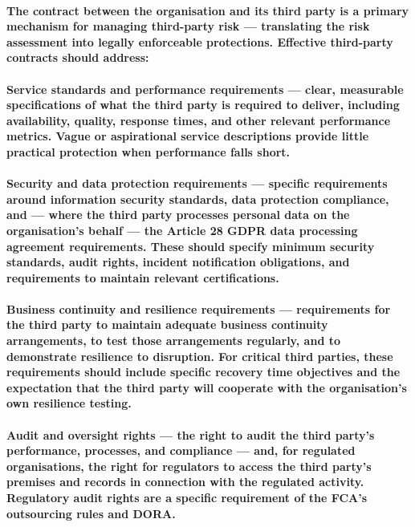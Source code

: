 \paragraph{The contract between the organisation and its third party is a primary mechanism for managing third-party risk — translating the risk assessment into legally enforceable protections. Effective third-party contracts should address:}
\paragraph{\textbf{Service standards and performance requirements} — clear, measurable specifications of what the third party is required to deliver, including availability, quality, response times, and other relevant performance metrics. Vague or aspirational service descriptions provide little practical protection when performance falls short.}
\paragraph{\textbf{Security and data protection requirements} — specific requirements around information security standards, data protection compliance, and — where the third party processes personal data on the organisation's behalf — the Article 28 GDPR data processing agreement requirements. These should specify minimum security standards, audit rights, incident notification obligations, and requirements to maintain relevant certifications.}
\paragraph{\textbf{Business continuity and resilience requirements} — requirements for the third party to maintain adequate business continuity arrangements, to test those arrangements regularly, and to demonstrate resilience to disruption. For critical third parties, these requirements should include specific recovery time objectives and the expectation that the third party will cooperate with the organisation's own resilience testing.}
\paragraph{\textbf{Audit and oversight rights} — the right to audit the third party's performance, processes, and compliance — and, for regulated organisations, the right for regulators to access the third party's premises and records in connection with the regulated activity. Regulatory audit rights are a specific requirement of the FCA's outsourcing rules and DORA.}
